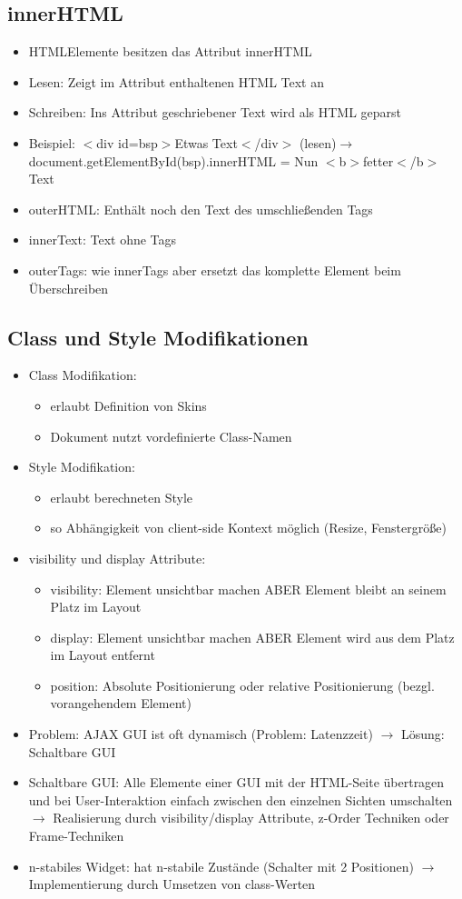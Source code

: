 \documentclass{article} %
\begin{document}
	\subsection{innerHTML}
	\begin{itemize}
		\item HTMLElemente besitzen das Attribut innerHTML
		\item Lesen: Zeigt im Attribut enthaltenen HTML Text an
		\item Schreiben: Ins Attribut geschriebener Text wird als HTML geparst
		\item Beispiel: $<$div id=\grqq bsp\grqq$>$Etwas Text$<$/div$>$ (lesen)$\rightarrow$document.getElementById(\glqq bsp\glqq ).innerHTML = \glqq Nun $<$b$>$fetter$<$/b$>$
		Text\glqq 
		\item outerHTML: Enthält noch den Text des umschließenden Tags
		\item innerText: Text ohne Tags
		\item outerTags: wie innerTags aber ersetzt das komplette Element beim Überschreiben
	\end{itemize}
	\subsection{Class und Style Modifikationen}
	\begin{itemize}
		\item Class Modifikation:
		\begin{itemize}
			\item erlaubt Definition von Skins
			\item Dokument nutzt vordefinierte Class-Namen
		\end{itemize}
		\item Style Modifikation:
		\begin{itemize}
			\item erlaubt berechneten Style
			\item so Abhängigkeit von client-side Kontext möglich (Resize, Fenstergröße)
		\end{itemize}
		\item visibility und display Attribute:
		\begin{itemize}
			\item visibility: Element unsichtbar machen ABER Element bleibt an seinem Platz im Layout
			\item display: Element unsichtbar machen ABER Element wird aus dem Platz im Layout entfernt
			\item position: Absolute Positionierung oder relative Positionierung (bezgl. vorangehendem Element)
		\end{itemize}
		\item Problem: AJAX GUI ist oft dynamisch (Problem: Latenzzeit) $\rightarrow$ Lösung: Schaltbare GUI
		\item Schaltbare GUI: Alle Elemente einer GUI mit der HTML-Seite übertragen und bei User-Interaktion einfach zwischen den einzelnen Sichten umschalten $\rightarrow$ Realisierung durch visibility/display Attribute, z-Order Techniken oder Frame-Techniken
		\item n-stabiles Widget: hat n-stabile Zustände (Schalter mit 2 Positionen) $\rightarrow$ Implementierung durch Umsetzen von class-Werten
	\end{itemize}
\end{document}
